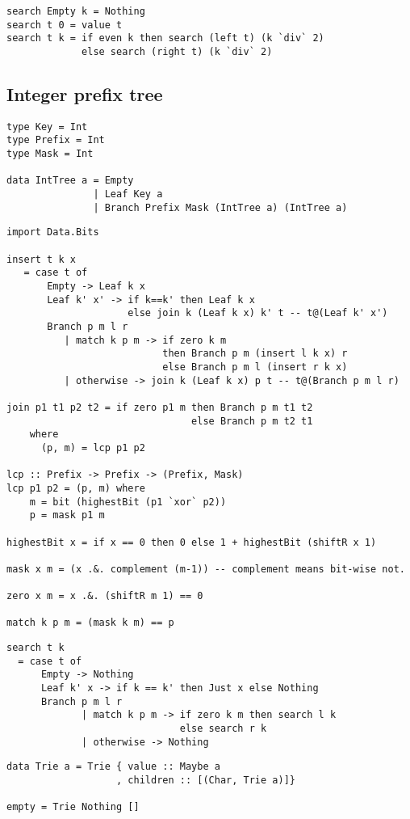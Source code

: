 \documentclass{article}
\begin{document}
\lstset{language=Haskell}
\begin{lstlisting}[caption=Integer trie look up]
search Empty k = Nothing
search t 0 = value t
search t k = if even k then search (left t) (k `div` 2)
             else search (right t) (k `div` 2)
\end{lstlisting}

\subsection{Integer prefix tree}

\lstset{language=Haskell}
\begin{lstlisting}[caption=Integer prefix tree definition]
type Key = Int
type Prefix = Int
type Mask = Int

data IntTree a = Empty
               | Leaf Key a
               | Branch Prefix Mask (IntTree a) (IntTree a)
\end{lstlisting}

\lstset{language=Haskell}
\begin{lstlisting}[caption=Integer prefix tree insertion.]
import Data.Bits

insert t k x
   = case t of
       Empty -> Leaf k x
       Leaf k' x' -> if k==k' then Leaf k x
                     else join k (Leaf k x) k' t -- t@(Leaf k' x')
       Branch p m l r
          | match k p m -> if zero k m
                           then Branch p m (insert l k x) r
                           else Branch p m l (insert r k x)
          | otherwise -> join k (Leaf k x) p t -- t@(Branch p m l r)

join p1 t1 p2 t2 = if zero p1 m then Branch p m t1 t2
                                else Branch p m t2 t1
    where
      (p, m) = lcp p1 p2

lcp :: Prefix -> Prefix -> (Prefix, Mask)
lcp p1 p2 = (p, m) where
    m = bit (highestBit (p1 `xor` p2))
    p = mask p1 m

highestBit x = if x == 0 then 0 else 1 + highestBit (shiftR x 1)

mask x m = (x .&. complement (m-1)) -- complement means bit-wise not.

zero x m = x .&. (shiftR m 1) == 0

match k p m = (mask k m) == p
\end{lstlisting}

\lstset{language=Haskell}
\begin{lstlisting}[caption=Lookup the integer prefix tree]
search t k
  = case t of
      Empty -> Nothing
      Leaf k' x -> if k == k' then Just x else Nothing
      Branch p m l r
             | match k p m -> if zero k m then search l k
                              else search r k
             | otherwise -> Nothing
\end{lstlisting}

\lstset{language=Haskell}
\begin{lstlisting}[caption=Definition of Alphabetic trie]
data Trie a = Trie { value :: Maybe a
                   , children :: [(Char, Trie a)]}

empty = Trie Nothing []
\end{lstlisting}


\ifx\wholebook\relax \else
\end{document}
